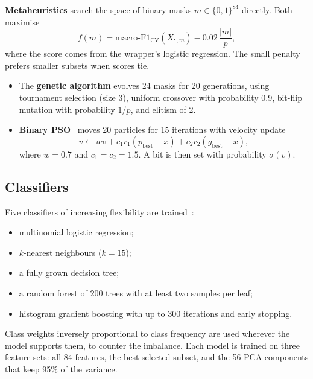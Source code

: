 \documentclass[conference]{IEEEtran}
\begin{document}
\textbf{Metaheuristics} search the space of binary masks $m \in \{0,1\}^{84}$ directly. Both maximise
\begin{equation}
f(m) = \text{macro-F1}_{\text{CV}}(X_{:,m}) - 0.02\,\frac{|m|}{p},
\end{equation}
where the score comes from the wrapper's logistic regression. The small penalty prefers smaller subsets when scores tie.
\begin{itemize}
    \item The \textbf{genetic algorithm} evolves 24 masks for 20 generations, using tournament selection (size 3), uniform crossover with probability 0.9, bit-flip mutation with probability $1/p$, and elitism of 2.
    \item \textbf{Binary PSO}~\cite{kennedy1997bpso} moves 20 particles for 15 iterations with velocity update
    \begin{equation}
    v \leftarrow w v + c_1 r_1 (p_{\text{best}} - x) + c_2 r_2 (g_{\text{best}} - x),
    \end{equation}
    where $w = 0.7$ and $c_1 = c_2 = 1.5$. A bit is then set with probability $\sigma(v)$.
\end{itemize}

\subsection{Classifiers}
Five classifiers of increasing flexibility are trained~\cite{sklearn}:
\begin{itemize}
    \item multinomial logistic regression;
    \item $k$-nearest neighbours ($k=15$);
    \item a fully grown decision tree;
    \item a random forest of 200 trees with at least two samples per leaf;
    \item histogram gradient boosting with up to 300 iterations and early stopping.
\end{itemize}
Class weights inversely proportional to class frequency are used wherever the model supports them, to counter the imbalance. Each model is trained on three feature sets: all 84 features, the best selected subset, and the 56 PCA components that keep 95\% of the variance.
\end{document}
